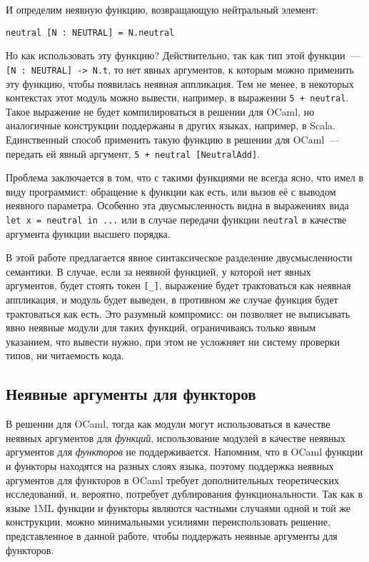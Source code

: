 \documentclass[../diploma.tex]{subfiles}
\begin{document}
И определим неявную функцию, возвращающую нейтральный элемент:

\begin{verbatim}
neutral [N : NEUTRAL] = N.neutral
\end{verbatim}

Но как использовать эту функцию? Действительно, так как тип этой функции~--- \texttt{[N : NEUTRAL] -> N.t}, то нет явных аргументов, к которым можно применить эту функцию, чтобы появилась неявная аппликация. Тем не менее, в некоторых контекстах этот модуль можно вывести, например, в выражении \texttt{5 + neutral}. Такое выражение не будет компилироваться в решении для OCaml, но аналогичные конструкции поддержаны в других языках, например, в Scala. Единственный способ применить такую функцию в решении для OCaml~--- передать ей явный аргумент, \texttt{5 + neutral [NeutralAdd]}.

Проблема заключается в том, что с такими функциями не всегда ясно, что имел в виду программист: обращение к функции как есть, или вызов её с выводом неявного параметра. Особенно эта двусмысленность видна в выражениях вида \\\texttt{let x = neutral in ...} или в случае передачи функции \texttt{neutral} в качестве аргумента функции высшего порядка. 

В этой работе предлагается явное синтаксическое разделение двусмысленности семантики. В случае, если за неявной функцией, у которой нет явных аргументов, будет стоять токен \texttt{[_]}, выражение будет трактоваться как неявная аппликация, и модуль будет выведен, в противном же случае функция будет трактоваться как есть. Это разумный компромисс: он позволяет не выписывать явно неявные модули для таких функций, ограничиваясь только явным указанием, что вывести нужно, при этом не усложняет ни систему проверки типов, ни читаемость кода.

\subsection{Неявные аргументы для функторов}

В решении для OCaml, тогда как модули могут использоваться в качестве неявных аргументов для \textit{функций}, использование модулей в качестве неявных аргументов для \textit{функторов} не поддерживается. Напомним, что в OCaml функции и функторы находятся на разных слоях языка, поэтому поддержка неявных аргументов для функторов в OCaml требует дополнительных теоретических исследований, и, вероятно, потребует дублирования функциональности. Так как в языке 1ML функции и функторы являются частными случаями одной и той же конструкции, можно минимальными усилиями переиспользовать решение, представленное в данной работе, чтобы поддержать неявные аргументы для функторов.
\end{document}
